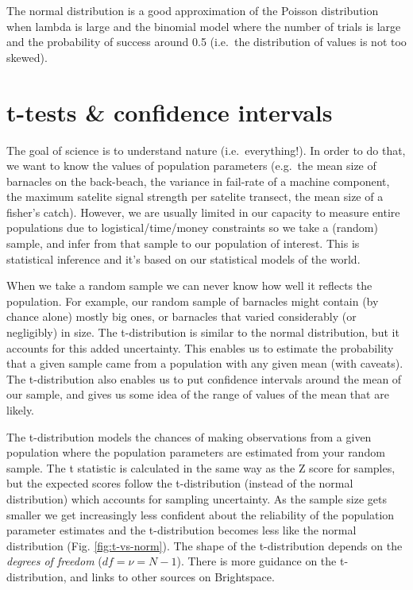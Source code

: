 \documentclass[
  11pt,
  a4paper,
]{book}
\begin{document}
The normal distribution is a good approximation of the Poisson distribution when lambda is large and the binomial model where the number of trials is large and the probability of success around 0.5 (i.e.~the distribution of values is not too skewed).

\hypertarget{t-test}{%
\chapter{t-tests \& confidence intervals}\label{t-test}}

The goal of science is to understand nature (i.e.~everything!). In order to do that, we want to know the values of population parameters (e.g.~the mean size of barnacles on the back-beach, the variance in fail-rate of a machine component, the maximum satelite signal strength per satelite transect, the mean size of a fisher's catch). However, we are usually limited in our capacity to measure entire populations due to logistical/time/money constraints so we take a (random) sample, and infer from that sample to our population of interest. This is statistical inference and it's based on our statistical models of the world.

When we take a random sample we can never know how well it reflects the population. For example, our random sample of barnacles might contain (by chance alone) mostly big ones, or barnacles that varied considerably (or negligibly) in size. The t-distribution is similar to the normal distribution, but it accounts for this added uncertainty. This enables us to estimate the probability that a given sample came from a population with any given mean (with caveats). The t-distribution also enables us to put confidence intervals around the mean of our sample, and gives us some idea of the range of values of the mean that are likely.

The t-distribution models the chances of making observations from a given population where the population parameters are estimated from your random sample. The t statistic is calculated in the same way as the Z score for samples, but the expected scores follow the t-distribution (instead of the normal distribution) which accounts for sampling uncertainty. As the sample size gets smaller we get increasingly less confident about the reliability of the population parameter estimates and the t-distribution becomes less like the normal distribution (Fig. \ref{fig:t-vs-norm}). The shape of the t-distribution depends on the \emph{degrees of freedom} (\(df = \nu = N-1\)). There is more guidance on the t-distribution, and links to other sources on Brightspace.
\end{document}
